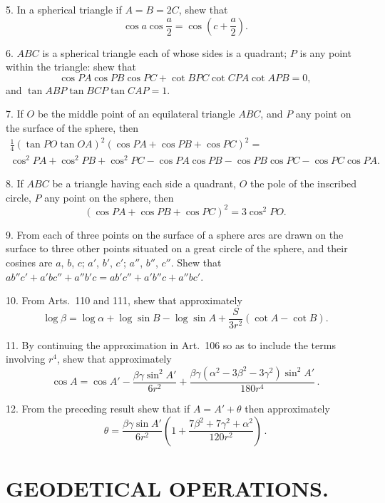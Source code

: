 \documentclass{book}[2004/02/16]
\begin{document}
\begin{mainmatter}
\begin{spacing}{1.3}
5. In a spherical triangle if $A = B = 2C$, shew that
\[
\cos a\cos\frac{a}{2} = \cos\left( c+\frac{a}{2}\right).
\]

6. $ABC$ is a spherical triangle each of whose sides is a quadrant;
$P$ is any point within the triangle: shew that
\[
\cos PA \cos PB \cos PC + \cot BPC \cot CPA \cot APB = 0,
\]
and \hfill$
\tan ABP \tan BCP \tan CAP = 1.
$\hfill\phantom{and}
\medskip

7. If $O$ be the middle point of an equilateral triangle $ABC$,
and $P$ any point on the surface of the sphere, then
\begin{gather*}
\tfrac{1}{4} (\tan PO \tan OA)^2 (\cos PA + \cos PB + \cos PC)^2 = \\
\cos^2 PA + \cos^2 PB + \cos^2 PC - \cos PA \cos PB - \cos PB \cos PC - \cos PC \cos PA.
\end{gather*}

8. If $ABC$ be a triangle having each side a quadrant, $O$ the
pole of the inscribed circle, $P$ any point on the sphere, then
\[
(\cos PA + \cos PB + \cos PC)^2 = 3\cos^2 PO.
\]

9. From each of three points on the surface of a sphere arcs
are drawn on the surface to three other points situated on a great
circle of the sphere, and their cosines are $a$, $b$, $c$; $a'$, $b'$, $c'$; $a''$, $b''$, $c''$.
Shew that $ab''c' + a'bc'' + a''b'c = ab'c'' + a'b''c + a''bc'$.
\medskip

10. From Arts.~110 and 111, shew that approximately
\[
\log\beta = \log\alpha + \log\sin B - \log\sin A + \frac{S}{3r^2}(\cot A-\cot B).
\]

11. By continuing the approximation in Art.~106 so as to
include the terms involving $r^4$, shew that approximately
\[
\cos A = \cos A' - \frac{\beta\gamma\sin^2 A'}{6r^2}
 + \frac{\beta\gamma(\alpha^2-3\beta^2-3\gamma^2)\sin^2 A'}{180r^4}\,.
\]

12. From the preceding result shew that if $A = A' + \theta$ then
approximately
\[
\theta = \frac{\beta\gamma\sin A'}{6r^2}
  \left( 1+\frac{7\beta^2 + 7\gamma^2 + \alpha^2}{120 r^2} \right)\,.
\]

\chapter[Geodetical Operations.]{GEODETICAL OPERATIONS.}


\end{spacing}
\end{mainmatter}
\end{document}
